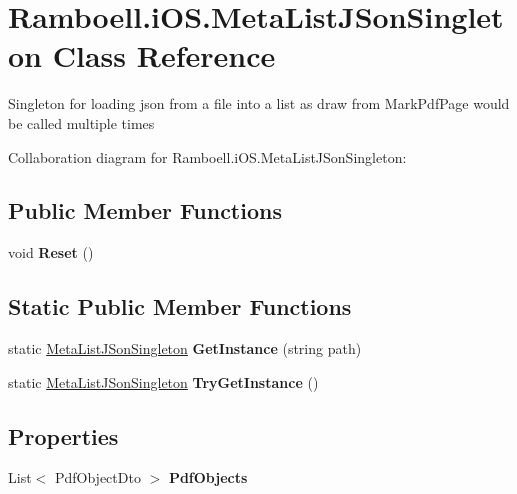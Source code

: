 \hypertarget{class_ramboell_1_1i_o_s_1_1_meta_list_j_son_singleton}{}\section{Ramboell.\+i\+O\+S.\+Meta\+List\+J\+Son\+Singleton Class Reference}
\label{class_ramboell_1_1i_o_s_1_1_meta_list_j_son_singleton}


Singleton for loading json from a file into a list as draw from Mark\+Pdf\+Page would be called multiple times  




Collaboration diagram for Ramboell.\+i\+O\+S.\+Meta\+List\+J\+Son\+Singleton\+:
\subsection*{Public Member Functions}
\begin{DoxyCompactItemize}
\item 
\mbox{\label{class_ramboell_1_1i_o_s_1_1_meta_list_j_son_singleton_a515bd2adaadc63f39c96b329074bf390}} 
void {\bfseries Reset} ()
\end{DoxyCompactItemize}
\subsection*{Static Public Member Functions}
\begin{DoxyCompactItemize}
\item 
\mbox{\label{class_ramboell_1_1i_o_s_1_1_meta_list_j_son_singleton_a6ccf9aa0f83d994c9e711c93fbcf17cd}} 
static \hyperlink{class_ramboell_1_1i_o_s_1_1_meta_list_j_son_singleton}{Meta\+List\+J\+Son\+Singleton} {\bfseries Get\+Instance} (string path)
\item 
\mbox{\label{class_ramboell_1_1i_o_s_1_1_meta_list_j_son_singleton_a4e654af0774fd51b8509bbcba9376a8c}} 
static \hyperlink{class_ramboell_1_1i_o_s_1_1_meta_list_j_son_singleton}{Meta\+List\+J\+Son\+Singleton} {\bfseries Try\+Get\+Instance} ()
\end{DoxyCompactItemize}
\subsection*{Properties}
\begin{DoxyCompactItemize}
\item 
\mbox{\label{class_ramboell_1_1i_o_s_1_1_meta_list_j_son_singleton_ae3bdc50a2c96e628e41c00b82a779c63}} 
List$<$ Pdf\+Object\+Dto $>$ {\bfseries Pdf\+Objects}
\end{DoxyCompactItemize}
